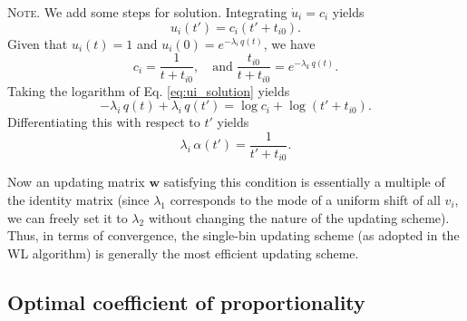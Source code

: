 \documentclass[reprint]{revtex4-1}
\newcommand{\note}[1]{{\color{DarkGreen}\footnotesize \textsc{Note.} #1}}
\begin{document}
%
\note{
  We add some steps for solution.
  Integrating $\dot u_i = c_i$ yields
  \begin{equation}
  u_i(t') = c_i \left(t' + t_{i0} \right).
  \label{eq:ui_solution}
  \end{equation}
  Given that $u_i(t) = 1$ and $u_i(0) = e^{-\lambda_i \, q(t)}$,
  we have
  $$
  c_i = \frac{ 1 }{ t + t_{i0} },
  \quad
  \mathrm{and\;}
  \frac{ t_{i0} } { t + t_{i0} }
  =
  e^{ -\lambda_k \, q(t) }.
  $$
  Taking the logarithm of Eq. \eqref{eq:ui_solution} yields
  $$
  -\lambda_i \, q(t) + \lambda_i \, q(t')
  = \log c_i + \log\left( t' + t_{i0} \right).
  $$
  Differentiating this with respect to $t'$ yields
  $$
  \lambda_i \, \alpha(t') = \frac{ 1 } { t' + t_{i0} }.
  $$
}

Now an updating matrix $\mathbf w$ satisfying this condition
is essentially a multiple of the identity matrix
(since $\lambda_1$ corresponds to the mode
of a uniform shift of all $v_i$,
we can freely set it to $\lambda_2$
without changing the nature of the updating scheme).
%
Thus, in terms of convergence,
the single-bin updating scheme
(as adopted in the WL algorithm)
is generally the most efficient
updating scheme.




\subsection{Optimal coefficient of proportionality}
\end{document}
